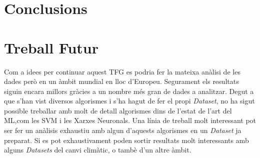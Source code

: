 \documentclass[10pt,a4paper,twocolumn,twoside]{article}
\begin{document}
\section {Conclusions}

\section{Treball Futur}
Com a idees per continuar aquest TFG es podria fer la mateixa anàlisi de les dades però en un àmbit mundial en lloc d'Europeu. Segurament els resultats siguin encara millors gràcies a un nombre més gran de dades a analitzar. Degut a que s'han vist diversos algorismes i s'ha hagut de fer el propi \textit{Dataset}, no ha sigut possible treballar amb molt de detall algorismes dins de l'estat de l'art del ML,com les SVM i les Xarxes Neuronals. Una línia de treball molt interessant pot ser fer un anàlisis exhaustiu amb algun d'aquests algorismes en un \textit{Dataset} ja preparat. Si es pot exhaustivament poden sortir resultats molt interessants amb alguns \textit{Datasets} del canvi climàtic, o tambè d'un altre àmbit.
\end{document}

